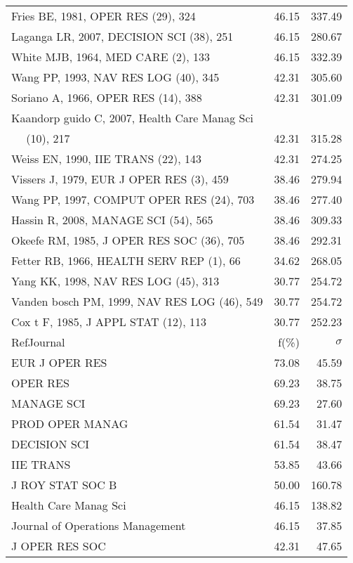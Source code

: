 \documentclass[a4paper,11pt]{report}
\begin{document}
\begin{landscape}
\begin{table}[!ht]
{\begin{tabular}{|l r r|}
Fries BE, 1981, OPER RES (29), 324 & 46.15 & 337.49\\
Laganga LR, 2007, DECISION SCI (38), 251 & 46.15 & 280.67\\
White MJB, 1964, MED CARE (2), 133 & 46.15 & 332.39\\
Wang PP, 1993, NAV RES LOG (40), 345 & 42.31 & 305.60\\
Soriano A, 1966, OPER RES (14), 388 & 42.31 & 301.09\\
Kaandorp guido C, 2007, Health Care Manag Sci &  & \\
$\quad$ (10), 217 & 42.31 & 315.28\\
Weiss EN, 1990, IIE TRANS (22), 143 & 42.31 & 274.25\\
Vissers J, 1979, EUR J OPER RES (3), 459 & 38.46 & 279.94\\
Wang PP, 1997, COMPUT OPER RES (24), 703 & 38.46 & 277.40\\
Hassin R, 2008, MANAGE SCI (54), 565 & 38.46 & 309.33\\
Okeefe RM, 1985, J OPER RES SOC (36), 705 & 38.46 & 292.31\\
Fetter RB, 1966, HEALTH SERV REP (1), 66 & 34.62 & 268.05\\
Yang KK, 1998, NAV RES LOG (45), 313 & 30.77 & 254.72\\
Vanden bosch PM, 1999, NAV RES LOG (46), 549 & 30.77 & 254.72\\
Cox t F, 1985, J APPL STAT (12), 113 & 30.77 & 252.23\\
\hline
\hline
RefJournal & f(\%) & $\sigma$\\
\hline
EUR J OPER RES & 73.08 & 45.59\\
OPER RES & 69.23 & 38.75\\
MANAGE SCI & 69.23 & 27.60\\
PROD OPER MANAG & 61.54 & 31.47\\
DECISION SCI & 61.54 & 38.47\\
IIE TRANS & 53.85 & 43.66\\
J ROY STAT SOC B & 50.00 & 160.78\\
Health Care Manag Sci & 46.15 & 138.82\\
Journal of Operations Management & 46.15 & 37.85\\
J OPER RES SOC & 42.31 & 47.65\\
\hline
\end{tabular}
}
\end{table}

\end{landscape}
\end{document}
